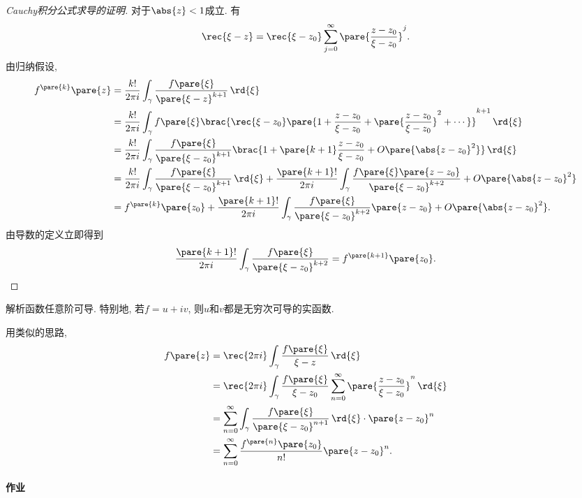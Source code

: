 \documentclass{ctexart}
\begin{document}
\begin{proof}[Cauchy积分公式求导的证明]
    对于$\abs{z}<1$成立. 有
    \[ \rec{\xi - z} = \rec{\xi - z_0} \sum_{j=0}^\infty  \pare{\frac{z-z_0}{\xi - z_0}}^j. \]
    由归纳假设,
    \begin{align*}
        f^{\pare{k}}\pare{z} &= \frac{k!}{2\pi i} \int_\gamma \frac{f\pare{\xi}}{\pare{\xi - z}^{k+1}}\,\rd{\xi} \\
        &= \frac{k!}{2\pi i} \int_\gamma f\pare{\xi} \brac{\rec{\xi - z_0} \pare{1+\frac{z-z_0}{\xi - z_0} + \pare{\frac{z-z_0}{\xi - z_0}}^2 + \cdots}}^{k+1}\,\rd{\xi} \\
        &= \frac{k!}{2\pi i} \int_\gamma \frac{f\pare{\xi}}{\pare{\xi - z_0}^{k+1}} \brac{1+\pare{k+1}\frac{z-z_0}{\xi - z_0} + O\pare{\abs{z-z_0}^2}}\,\rd{\xi} \\
        &= \frac{k!}{2\pi i} \int_\gamma \frac{f\pare{\xi}}{\pare{\xi - z_0}^{k+1}} \,\rd{\xi} + \frac{\pare{k+1}!}{2\pi i} \int_\gamma \frac{f\pare{\xi}\pare{z-z_0}}{\pare{\xi - z_0}^{k+2}} + O\pare{\abs{z-z_0}^2} \\
        &= f^{\pare{k}}\pare{z_0} + \frac{\pare{k+1}!}{2\pi i} \int_\gamma \frac{f\pare{\xi}}{\pare{\xi - z_0}^{k+2}}\pare{z-z_0} + O\pare{\abs{z-z_0}^2}.
    \end{align*}
    由导数的定义立即得到
    \[ \frac{\pare{k+1}!}{2\pi i} \int_\gamma \frac{f\pare{\xi}}{\pare{\xi - z_0}^{k+2}} = f^{\pare{k+1}}\pare{z_0}. \qedhere \]
\end{proof}
\begin{corollary}
    \label{coll:一次可导次次可导}
    解析函数任意阶可导. 特别地, 若$f=u+iv$, 则$u$和$v$都是无穷次可导的实函数.
\end{corollary}
\begin{remark}
    用类似的思路,
    \begin{align*}
        f\pare{z} &= \rec{2\pi i} \int_\gamma \frac{f\pare{\xi}}{\xi - z}\,\rd{\xi} \\
        &= \rec{2\pi i} \int_\gamma \frac{f\pare{\xi}}{\xi - z_0} \sum_{n=0}^\infty \pare{\frac{z-z_0}{\xi - z_0}}^n\,\rd{\xi} \\
        &= \sum_{n=0}^\infty \int_\gamma \frac{f\pare{\xi}}{\pare{\xi - z_0}^{n+1}}\,\rd{\xi} \cdot\pare{z-z_0}^n \\
        &= \sum_{n=0}^\infty \frac{f^{\pare{n}}\pare{z_0}}{n!}\pare{z-z_0}^n.
    \end{align*}
\end{remark}

\paragraph{作业} %
\label{par:作业}
\end{document}
